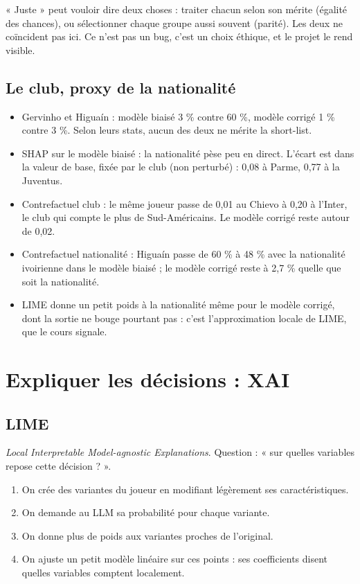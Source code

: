 \documentclass[11pt,a4paper]{article}
\begin{document}
\begin{simple}
« Juste » peut vouloir dire deux choses : traiter chacun selon son mérite (égalité des chances), ou sélectionner chaque groupe aussi souvent (parité). Les deux ne coïncident pas ici. Ce n'est pas un bug, c'est un choix éthique, et le projet le rend visible.
\end{simple}

\subsection{Le club, proxy de la nationalité}
\begin{itemize}
  \item Gervinho et Higuaín : modèle biaisé 3 \% contre 60 \%, modèle corrigé 1 \% contre 3 \%. Selon leurs stats, aucun des deux ne mérite la short-list.
  \item SHAP sur le modèle biaisé : la nationalité pèse peu en direct. L'écart est dans la valeur de base, fixée par le club (non perturbé) : 0,08 à Parme, 0,77 à la Juventus.
  \item Contrefactuel club : le même joueur passe de 0,01 au Chievo à 0,20 à l'Inter, le club qui compte le plus de Sud-Américains. Le modèle corrigé reste autour de 0,02.
  \item Contrefactuel nationalité : Higuaín passe de 60 \% à 48 \% avec la nationalité ivoirienne dans le modèle biaisé ; le modèle corrigé reste à 2,7 \% quelle que soit la nationalité.
  \item LIME donne un petit poids à la nationalité même pour le modèle corrigé, dont la sortie ne bouge pourtant pas : c'est l'approximation locale de LIME, que le cours signale.
\end{itemize}

\section{Expliquer les décisions : XAI}
\subsection{LIME}
\emph{Local Interpretable Model-agnostic Explanations}. Question : « sur quelles variables repose cette décision ? ».
\begin{enumerate}
  \item On crée des variantes du joueur en modifiant légèrement ses caractéristiques.
  \item On demande au LLM sa probabilité pour chaque variante.
  \item On donne plus de poids aux variantes proches de l'original.
  \item On ajuste un petit modèle linéaire sur ces points : ses coefficients disent quelles variables comptent localement.
\end{enumerate}
\end{document}
